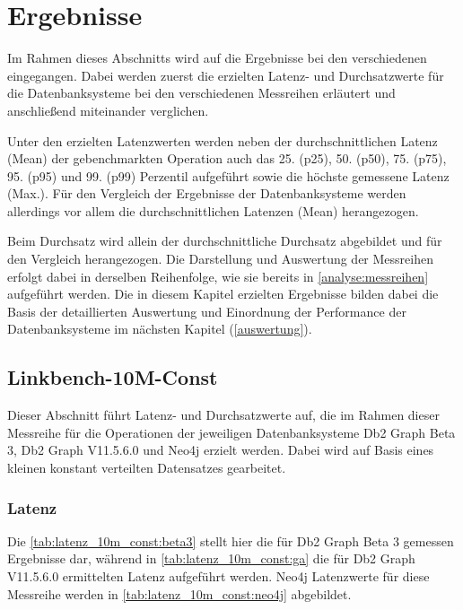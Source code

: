 \chapter{Ergebnisse}
\label{ergebnisse}

Im Rahmen dieses Abschnitts wird auf die Ergebnisse bei den verschiedenen  eingegangen. Dabei werden zuerst die erzielten Latenz- und Durchsatzwerte für die Datenbanksysteme bei den verschiedenen Messreihen erläutert und anschließend miteinander verglichen. 

Unter den erzielten Latenzwerten werden neben der durchschnittlichen Latenz (Mean) der gebenchmarkten Operation auch das 25. (p25), 50. (p50), 75. (p75), 95. (p95) und 99. (p99) Perzentil aufgeführt sowie die höchste gemessene Latenz (Max.). Für den Vergleich der Ergebnisse der Datenbanksysteme werden allerdings vor allem die durchschnittlichen Latenzen (Mean) herangezogen. 

Beim Durchsatz wird allein der durchschnittliche Durchsatz abgebildet und für den Vergleich herangezogen. Die Darstellung und Auswertung der Messreihen erfolgt dabei in derselben Reihenfolge, wie sie bereits in \autoref{analyse:messreihen} aufgeführt werden. Die in diesem Kapitel erzielten Ergebnisse bilden dabei die Basis der detaillierten Auswertung und Einordnung der Performance der Datenbanksysteme im nächsten Kapitel (\autoref{auswertung}).

\section{Linkbench-10M-Const}
\label{ergebnisse:10m_const}
Dieser Abschnitt führt Latenz- und Durchsatzwerte auf, die im Rahmen dieser Messreihe für die Operationen der jeweiligen Datenbanksysteme Db2 Graph Beta 3, Db2 Graph V11.5.6.0 und Neo4j erzielt werden. Dabei wird auf Basis eines kleinen konstant verteilten Datensatzes gearbeitet.

\subsection{Latenz}

Die \autoref{tab:latenz_10m_const:beta3} stellt hier die für Db2 Graph Beta 3 gemessen Ergebnisse dar, während in \autoref{tab:latenz_10m_const:ga} die für Db2 Graph V11.5.6.0 ermittelten Latenz aufgeführt werden. Neo4j Latenzwerte für diese Messreihe werden in \autoref{tab:latenz_10m_const:neo4j} abgebildet.

